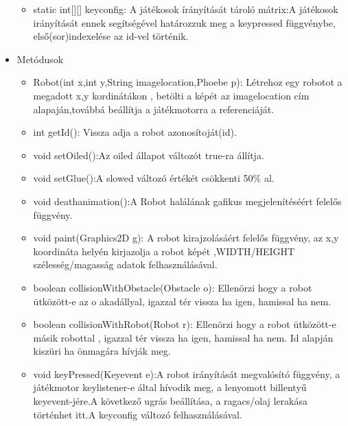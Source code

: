 \begin{itemize}
\begin{itemize}
		\item static int[][] keyconfig: A játékosok írányítását tároló mátrix:A játékosok irányítását ennek segítségével határozzuk meg a keypressed függvénybe, első(sor)indexelése az id-vel történik.
\end{itemize}
\item Metódusok\\
	\begin{itemize}
		\item Robot(int x,int y,String imagelocation,Phoebe p): Létrehoz egy robotot a megadott x,y kordinátákon , betölti a képét az imagelocation cím alapaján,továbbá beállítja a játékmotorra a referenciáját.
		\item int getId(): Vissza adja a robot azonosítoját(id).
		\item void setOiled():Az oiled állapot változót true-ra állítja.
		\item void setGlue():A slowed változó értékét csökkenti 50\% al.
		\item void deathanimation():A Robot halálának gafikus megjelenítéséért felelős függvény.
		\item void paint(Graphics2D g): A robot kirajzolásáért felelős függvény, az x,y koordináta helyén kirjazolja a robot képét ,WIDTH/HEIGHT szélesség/magasság adatok felhasználásával.
		\item boolean collisionWithObstacle(Obstacle o): Ellenörzi hogy a robot ütközött-e az o akadállyal, igazzal tér vissza ha igen, hamissal ha nem.
		\item boolean collisionWithRobot(Robot r): Ellenörzi hogy a robot ütközött-e másik robottal , igazzal tér vissza ha igen, hamissal ha nem. Id alapján kiszüri ha önmagára hívják meg.
		\item void keyPressed(Keyevent e):A robot irányítását megvalósító függvény, a játékmotor keylistener-e által hívodik meg, a lenyomott billentyű keyevent-jére.A következő ugrás beállítása, a ragacs/olaj lerakása történhet itt.A keyconfig változó felhasználásával.
	\end{itemize}
\end{itemize}

